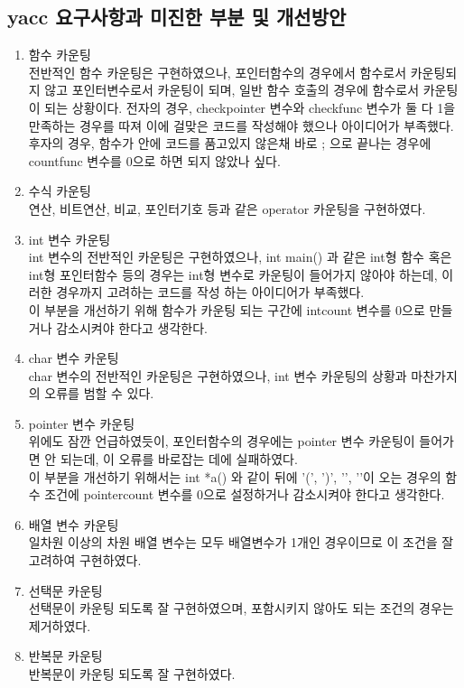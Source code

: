 \documentclass{article}
\begin{document}
\subsection{yacc 요구사항과 미진한 부분 및 개선방안}
\begin{enumerate}
    \item 함수 카운팅\\전반적인 함수 카운팅은 구현하였으나, 포인터함수의 경우에서 함수로서 카운팅되지 않고 포인터변수로서 카운팅이 되며, 일반 함수 호출의 경우에 함수로서 카운팅이 되는 상황이다. 전자의 경우, checkpointer 변수와 checkfunc 변수가 둘 다 1을 만족하는 경우를 따져 이에 걸맞은 코드를 작성해야 했으나 아이디어가 부족했다. 후자의 경우, 함수가 {} 안에 코드를 품고있지 않은채 바로 ; 으로 끝나는 경우에 countfunc 변수를 0으로 하면 되지 않았나 싶다.
    \item 수식 카운팅\\연산, 비트연산, 비교, 포인터기호 등과 같은 operator 카운팅을 구현하였다.
    \item int 변수 카운팅\\int 변수의 전반적인 카운팅은 구현하였으나, int main(){} 과 같은 int형 함수 혹은 int형 포인터함수 등의 경우는 int형 변수로 카운팅이 들어가지 않아야 하는데, 이러한 경우까지 고려하는 코드를 작성 하는 아이디어가 부족했다. \\ 이 부분을 개선하기 위해 함수가 카운팅 되는 구간에 intcount 변수를 0으로 만들거나 감소시켜야 한다고 생각한다.
    \item char 변수 카운팅\\char 변수의 전반적인 카운팅은 구현하였으나, int 변수 카운팅의 상황과 마찬가지의 오류를 범할 수 있다.
    \item pointer 변수 카운팅\\위에도 잠깐 언급하였듯이, 포인터함수의 경우에는 pointer 변수 카운팅이 들어가면 안 되는데, 이 오류를 바로잡는 데에 실패하였다. \\ 이 부분을 개선하기 위해서는 int *a(){} 와 같이 뒤에 '(', ')', '{', '}'이 오는 경우의 함수 조건에 pointercount 변수를 0으로 설정하거나 감소시켜야 한다고 생각한다.
    \item 배열 변수 카운팅\\일차원 이상의 차원 배열 변수는 모두 배열변수가 1개인 경우이므로 이 조건을 잘 고려하여 구현하였다.
    \item 선택문 카운팅\\선택문이 카운팅 되도록 잘 구현하였으며, 포함시키지 않아도 되는 조건의 경우는 제거하였다.
    \item 반복문 카운팅\\반복문이 카운팅 되도록 잘 구현하였다.

\end{enumerate}
\end{document}

